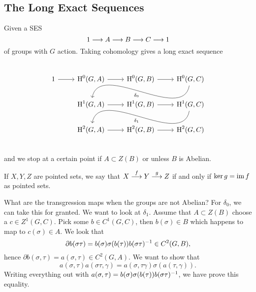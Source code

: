 \subsection{The Long Exact Sequences}
\begin{theorem}\label{6.5}
Given a SES $$1 \longrightarrow A \longrightarrow B \longrightarrow C \longrightarrow 1$$ of groups with $G$ action. Taking cohomology gives a long exact sequence
$$
\begin{tikzcd}
1 \arrow{r} & \cH^0(G,A) \arrow{r} & \cH^0(G,B) \arrow{r} & \cH^0(G,C) \arrow[in=80, out=-100]{lld}{\delta_0} \\ 
{} & \cH^1(G,A) \arrow{r} & \cH^1(G,B) \arrow{r} & \cH^1(G,C) \arrow[in=80, out=-100]{lld}{\delta_1} \\
{} & \cH^2(G,A) \arrow{r} & \cH^2(G,B) \arrow{r} & \cH^2(G,C) 
\end{tikzcd}
$$
and we stop at a certain point if $A \subset Z(B)$ or unless $B$ is Abelian.
\end{theorem}
\begin{remark}\label{6.6}
If $X,Y,Z$ are pointed sets, we say that $X \overset{f}{\longrightarrow } Y \overset{g}{\longrightarrow }Z$ if and only if $\ker g = \operatorname{im} f$ as pointed sets.
\end{remark}


What are the transgression maps when the groups are not Abelian? 
For $\delta_0$, we can take this for granted. We want to look at $\delta_1$. Assume that $A \subset Z(B)$ choose a $c \in Z^1(G,C)$. Pick some $b \in C^1(G,C)$, then $b(\sigma) \in B$ which happens to map to $c(\sigma) \in A$. We look that 
$$\partial b(\sigma \tau)  = b(\sigma)\sigma(b(\tau))b(\sigma\tau)^{-1} \in C^2(G,B),$$
hence $\partial b(\sigma , \tau)= a(\sigma ,\tau) \in C^2(G,A)$. We want to show that 
$$a(\sigma , \tau)a(\sigma \tau, \gamma) = a(\sigma , \tau \gamma)\sigma (a(\tau , \gamma)).$$
Writing everything out with
$a(\sigma , \tau) = b(\sigma)\sigma (b(\tau))b(\sigma \tau)^{-1}$, we have prove this equality.

